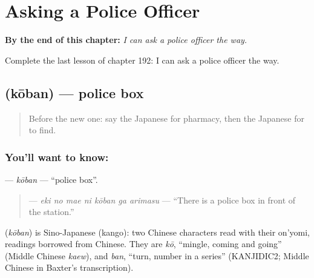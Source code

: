 
\chapter{Asking a Police Officer}
\label{ch:ja-asking-a-police-officer}

\begin{chapteropening}
\textbf{By the end of this chapter:} \emph{I can ask a police officer the way.}

Complete the last lesson of chapter 192: I can ask a police officer the way.
\end{chapteropening}

\section[\texorpdfstring{\ja{こうばん} (kōban)}{こうばん (kōban)}]{ (kōban) — police box}

\label{lesson:JA-C192-kouban}



\begin{quote}
Before the new one: say the Japanese for pharmacy, then the Japanese for to find.
\end{quote}

\subsection*{You'll want to know: }
\textbf{} — \emph{kōban} — \textquotedblleft{}police box\textquotedblright{}.

\begin{quote}
\textbf{   } — \emph{eki no mae ni kōban ga arimasu} — \textquotedblleft{}There is a police box in front of the station.\textquotedblright{}
\end{quote}

\begin{cousinweb}
\textbf{} (\emph{kōban}) is Sino-Japanese (kango): two Chinese characters read with their on'yomi, readings borrowed from Chinese. They are \emph{kō}, \textquotedblleft{}mingle, coming and going\textquotedblright{} (Middle Chinese \emph{kaew}), and \emph{ban}, \textquotedblleft{}turn, number in a series\textquotedblright{} (KANJIDIC2; Middle Chinese in Baxter's transcription).
\end{cousinweb}

